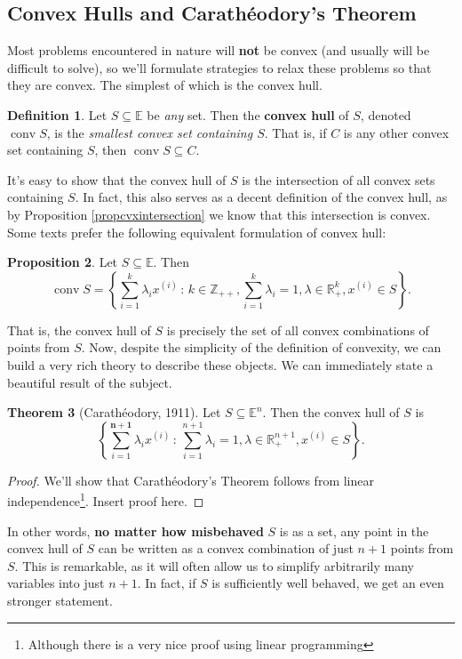 \documentclass[11pt]{article}
\numberwithin{equation}{section}
\theoremstyle{definition}
\newtheorem{theorem}{Theorem}[section]
\newtheorem{proposition}[theorem]{Proposition}
\newtheorem{definition}[theorem]{Definition}%
\newcommand{\bE}{\mathbb{E}}
\newcommand{\bR}{\mathbb{R}}
\newcommand{\bZ}{\mathbb{Z}}
\newcommand{\set}[2]{\left\{#1\,:\,#2\right\}}
\newcommand{\conv}{\operatorname{conv}}
\begin{document}
\subsection{Convex Hulls and Carath\'eodory's Theorem}
Most problems encountered in nature will \textbf{not} be convex (and usually will be difficult to solve), so we'll formulate strategies to relax these problems so that they are convex. The simplest of which is the convex hull.
\begin{definition}
    Let $S\subseteq\bE$ be \textit{any} set. Then the \textbf{convex hull} of $S$, denoted $\conv S$, is the \textit{smallest convex set containing $S$}. That is, if $C$ is any other convex set containing $S$, then $\conv S\subseteq C$.
\end{definition}
It's easy to show that the convex hull of $S$ is the intersection of all convex sets containing $S$. In fact, this also serves as a decent definition of the convex hull, as by Proposition \ref{propcvxintersection} we know that this intersection is convex. Some texts prefer the following equivalent formulation of convex hull:
\begin{proposition}
    Let $S\subseteq\bE$. Then
    \begin{equation}
        \conv S=\set{\sum_{i=1}^k\lambda_ix^{(i)}}{k\in \bZ_{++}, \sum_{i=1}^k\lambda_i=1, \lambda\in \bR_+^k, x^{(i)}\in S}.
    \end{equation}
\end{proposition}
That is, the convex hull of $S$ is precisely the set of all convex combinations of points from $S$. Now, despite the simplicity of the definition of convexity, we can build a very rich theory to describe these objects.
We can immediately state a beautiful result of the subject.
\begin{theorem}[Carath\'eodory, 1911]
    \label{thmcaratheodory}%
    Let $S\subseteq\bE^n$. Then the convex hull of $S$ is
    \begin{equation}
        \label{thmcaratheodoryeq}
        \set{\sum_{i=1}^{\mathbf{n+1}}\lambda_ix^{(i)}}{ \sum_{i=1}^{n+1}\lambda_i=1, \lambda\in \bR_+^{n+1}, x^{(i)}\in S}.
    \end{equation}
\end{theorem}
\begin{proof}
    We'll show that Carath\'eodory's Theorem follows from linear independence\footnote{Although there is a very nice proof using linear programming}. Insert proof here.
\end{proof}
In other words, \textbf{no matter how misbehaved} $S$ is as a set, any point in the convex hull of $S$ can be written as a convex combination of just $n+1$ points from $S$. This is remarkable, as it will often allow us to simplify arbitrarily many variables into just $n+1$. In fact, if $S$ is sufficiently well behaved, we get an even stronger statement.
\end{document}
